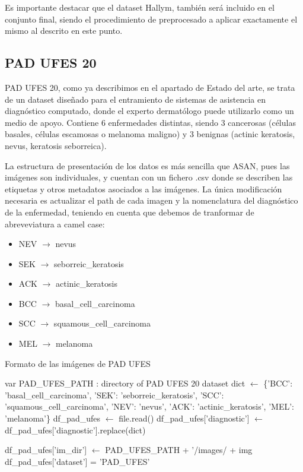 Es importante destacar que el dataset Hallym, también será incluido en el conjunto final, siendo el procedimiento de preprocesado a aplicar exactamente el mismo al descrito en este punto.

\subsection{PAD UFES 20}

PAD UFES 20, como ya describimos en el apartado de Estado del arte, se trata de un dataset diseñado para el entramiento de sistemas de asistencia en diagnóstico computado, donde el experto dermatólogo puede utilizarlo como un medio de apoyo. Contiene 6 enfermedades distintas, siendo 3 cancerosas (células basales, células escamosas o melanoma maligno) y 3 benignas (actinic keratosis, nevus, keratosis seborreica).

La estructura de presentación de los datos es más sencilla que ASAN, pues las imágenes son individuales, y cuentan con un fichero .csv donde se describen las etiquetas y otros metadatos asociados a las imágenes. La única modificación necesaria es actualizar el path de cada imagen y la nomenclatura del diagnóstico de la enfermedad, teniendo en cuenta que debemos de tranformar de abreveviatura a camel case:
\begin{itemize}
	\item NEV $\rightarrow$ nevus
	\item SEK  $\rightarrow$ seborreic\_keratosis 
	\item ACK $\rightarrow$ actinic\_keratosis  
	\item BCC $\rightarrow$  basal\_cell\_carcinoma           
	\item SCC $\rightarrow$ squamous\_cell\_carcinoma
	\item MEL $\rightarrow$ melanoma
	         
\end{itemize}



\begin{algorithm}

	\caption{Formato de las imágenes de PAD UFES}
	\label{cortarpadufes}
	\begin{algorithmic}
		\State  var PAD\_UFES\_PATH : directory of PAD UFES 20 dataset
		\State dict $\gets$ \{'BCC': 'basal\_cell\_carcinoma', 'SEK': 'seborreic\_keratosis', 'SCC': 'squamous\_cell\_carcinoma', 'NEV': 'nevus',
			'ACK': 'actinic\_keratosis', 'MEL': 'melanoma'\}
		\State df\_pad\_ufes $\gets$ file.read()
		\State  df\_pad\_ufes['diagnostic'] $\gets$ df\_pad\_ufes['diagnostic'].replace(dict)
		
			\State df\_pad\_ufes['im\_dir'] $\gets$  PAD\_UFES\_PATH + '/images/ + img
		   \State df\_pad\_ufes['dataset'] = 'PAD\_UFES'
	
	\EndFor		
		\EndProcedure
	\end{algorithmic}
\end{algorithm}


